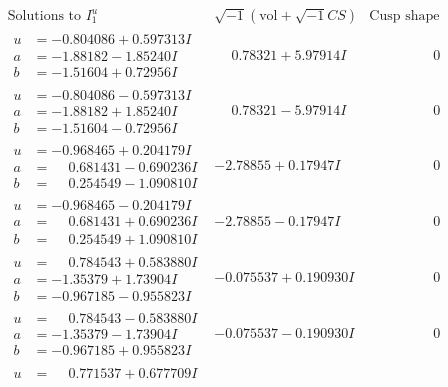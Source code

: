\documentclass[1p]{elsarticle_modified}
\theoremstyle{definition}
\newcommand{\I}{\sqrt{-1}}
\begin{document}
$$\begin{array}{c|c|c}  
\text{Solutions to }I^u_{1}& \I (\text{vol} + \sqrt{-1}CS) & \text{Cusp shape}\\
 \hline 
\begin{aligned}
u &= -0.804086 + 0.597313 I \\
a &= -1.88182 - 1.85240 I \\
b &= -1.51604 + 0.72956 I\end{aligned}
 & \phantom{-}0.78321 + 5.97914 I & \phantom{-0.000000 } 0 \\ \hline\begin{aligned}
u &= -0.804086 - 0.597313 I \\
a &= -1.88182 + 1.85240 I \\
b &= -1.51604 - 0.72956 I\end{aligned}
 & \phantom{-}0.78321 - 5.97914 I & \phantom{-0.000000 } 0 \\ \hline\begin{aligned}
u &= -0.968465 + 0.204179 I \\
a &= \phantom{-}0.681431 - 0.690236 I \\
b &= \phantom{-}0.254549 - 1.090810 I\end{aligned}
 & -2.78855 + 0.17947 I & \phantom{-0.000000 } 0 \\ \hline\begin{aligned}
u &= -0.968465 - 0.204179 I \\
a &= \phantom{-}0.681431 + 0.690236 I \\
b &= \phantom{-}0.254549 + 1.090810 I\end{aligned}
 & -2.78855 - 0.17947 I & \phantom{-0.000000 } 0 \\ \hline\begin{aligned}
u &= \phantom{-}0.784543 + 0.583880 I \\
a &= -1.35379 + 1.73904 I \\
b &= -0.967185 - 0.955823 I\end{aligned}
 & -0.075537 + 0.190930 I & \phantom{-0.000000 } 0 \\ \hline\begin{aligned}
u &= \phantom{-}0.784543 - 0.583880 I \\
a &= -1.35379 - 1.73904 I \\
b &= -0.967185 + 0.955823 I\end{aligned}
 & -0.075537 - 0.190930 I & \phantom{-0.000000 } 0 \\ \hline\begin{aligned}
u &= \phantom{-}0.771537 + 0.677709 I \\

\end{aligned}
\end{array}$$
\end{document}
